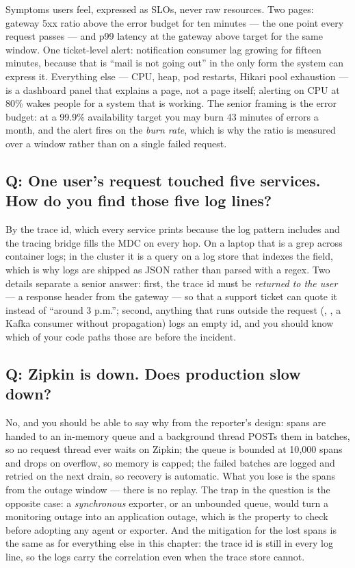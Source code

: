 Symptoms users feel, expressed as SLOs, never raw resources. Two pages:
gateway 5xx ratio above the error budget for ten minutes --- the one
point every request passes --- and p99 latency at the gateway above
target for the same window. One ticket-level alert: notification
consumer lag growing for fifteen minutes, because that is ``mail is not
going out'' in the only form the system can express it. Everything
else --- CPU, heap, pod restarts, Hikari pool exhaustion --- is a
dashboard panel that explains a page, not a page itself; alerting on
CPU at 80\% wakes people for a system that is working. The senior
framing is the error budget: at a 99.9\% availability target you may
burn 43 minutes of errors a month, and the alert fires on the
\emph{burn rate}, which is why the ratio is measured over a window
rather than on a single failed request.

\subsection*{Q: One user's request touched five services. How do you find those five log lines?}

By the trace id, which every service prints because the log pattern
includes  and the tracing bridge fills the MDC on
every hop. On a laptop that is a grep across container logs; in the
cluster it is a query on a log store that indexes the field, which is
why logs are shipped as JSON rather than parsed with a regex. Two
details separate a senior answer: first, the trace id must be
\emph{returned to the user} --- a  response header
from the gateway --- so that a support ticket can quote it instead of
``around 3 p.m.''; second, anything that runs outside the request
(, , a Kafka consumer without
propagation) logs an empty id, and you should know which of your code
paths those are before the incident.

\subsection*{Q: Zipkin is down. Does production slow down?}

No, and you should be able to say why from the reporter's design: spans
are handed to an in-memory queue and a background thread POSTs them in
batches, so no request thread ever waits on Zipkin; the queue is
bounded at 10{,}000 spans and drops on overflow, so memory is capped;
the failed batches are logged and retried on the next drain, so
recovery is automatic. What you lose is the spans from the outage
window --- there is no replay. The trap in the question is the
opposite case: a \emph{synchronous} exporter, or an unbounded queue,
would turn a monitoring outage into an application outage, which is
the property to check before adopting any agent or exporter. And the
mitigation for the lost spans is the same as for everything else in
this chapter: the trace id is still in every log line, so the logs
carry the correlation even when the trace store cannot.

